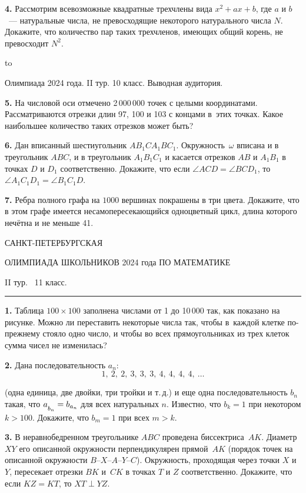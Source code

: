 \documentclass[12pt]{article}
\def\q#1.{{\bf #1. }}
\def\dotline{\smallskip\hbox to \hsize{\dotfill}\medskip}
\begin{document}
\q4. Рассмотрим всевозможные квадратные трехчлены вида ${x^2+ax+b}$, где 
$a$ и $b$~--- натуральные числа, не превосходящие некоторого натурального числа $N$. Докажите, что количество пар 
таких трехчленов, имеющих общий корень, не превосходит $N^2$.

\dotline

\centerline{Олимпиада 2024 года. II тур. 10 класс. Выводная аудитория.}
\smallskip

\q5. На числовой оси отмечено 2\,000\,000 точек с целыми координатами. Рассматриваются отрезки длин  97, 100 и 103 с концами в~этих точках. Какое наибольшее количество таких отрезков может быть?

\q6. Дан вписанный шестиугольник $AB_1CA_1BC_1$. Окружность~$\omega$ вписана и в треугольник $ABC$, и в треугольник $A_1B_1C_1$ и касается отрезков $AB$ и $A_1B_1$ в точках $D$ и $D_1$ соответственно. Докажите, что  если $\angle ACD = \angle BCD_1$, то $\angle A_1C_1D_1 = \angle B_1C_1D$.

\q7. Ребра полного графа на $1000$ вершинах покрашены в три цвета. Докажите, что в этом графе имеется несамопересекающийся одноцветный цикл, длина которого нечётна и не меньше 41.


\clearpage

\centerline{\sc САНКТ-ПЕТЕРБУРГСКАЯ}
\centerline{\sc ОЛИМПИАДА ШКОЛЬНИКОВ 2024 года ПО МАТЕМАТИКЕ}
\centerline{\sc II тур. \ 11 класс.}
\medskip
\hrule
\bigskip

\setrisbox\copy\kk

\q1. Таблица $100\times 100$ заполнена числами от 1 до 10\,000 так, как показано на рисунке.
Можно ли переставить некоторые числа так, чтобы 
\ris[\rismove(0pt,-4mm)]
в~каждой клетке по-прежнему стояло одно число, и чтобы во всех прямоугольниках из трех клеток сумма чисел не изменилась?

\q2. Дана последовательность $a_n$: 
$$
1, \ 2, \ 2, \ 3, \ 3, \ 3, \ 4, \ 4, \ 4, \ 4, \ \dots 
$$
\endris

\kern-4pt\noindent
(одна единица, две двойки, три тройки и т.\,д.) и еще одна последовательность $b_n$ такая, что $a\strut_{b_n}=b_{a_n}$ для всех натуральных $n$. Известно, что $b_{k}\!=\!1$ при некотором $k\!>\!100$. Докажите, что $b_m=1$ при всех $m>k$.

\q3. В неравнобедренном треугольнике $ABC$ проведена биссектриса~$AK$. Диаметр $XY$ его описанной окружности перпендикулярен прямой~$AK$ (порядок точек на описанной окружности $B$--$X$--$A$--$Y$--$C$). Окружность, проходящая через точки $X$ и $Y$, пересекает отрезки $BK$ и~$CK$ в точках $T$ и $Z$ соответственно. Докажите, что если $KZ = KT$, то $XT \perp YZ$.
\end{document}
